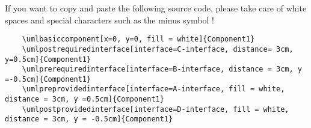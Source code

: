 \documentclass[a4paper,11pt, svgnames]{article}
\date{}
\title{}
\author{}
\begin{document}
\maketitle

If you want to copy and paste the following source code, please take care of white spaces and special characters such as the minus symbol !

\medskip
\lstset{breaklines=true, frame=trBL, language=tikzuml}
\begin{lstlisting}
    \umlbasiccomponent[x=0, y=0, fill = white]{Component1}
    \umlpostrequiredinterface[interface=C-interface, distance= 3cm, y=0.5cm]{Component1}
    \umlprerequiredinterface[interface=B-interface, distance = 3cm, y =-0.5cm]{Component1}
    \umlpreprovidedinterface[interface=A-interface, fill = white, distance = 3cm, y =0.5cm]{Component1}
    \umlpostprovidedinterface[interface=D-interface, fill = white, distance = 3cm, y = -0.5cm]{Component1}
\end{lstlisting}

\begin{center}
  \scalebox{2}
  {
  }
\end{center}
\end{document}
